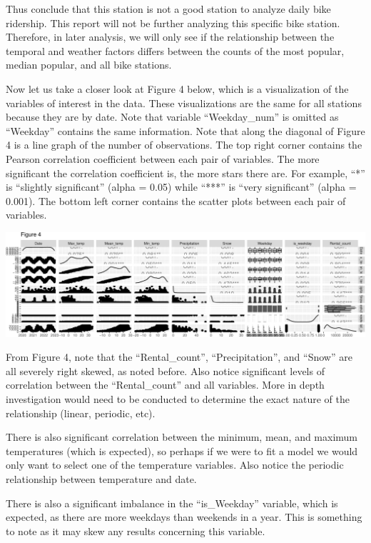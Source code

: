 \documentclass[
]{article}
\begin{document}
Thus conclude that this station is not a good station to analyze daily
bike ridership. This report will not be further analyzing this specific
bike station. Therefore, in later analysis, we will only see if the
relationship between the temporal and weather factors differs between
the counts of the most popular, median popular, and all bike stations.

Now let us take a closer look at Figure 4 below, which is a
visualization of the variables of interest in the data. These
visualizations are the same for all stations because they are by date.
Note that variable ``Weekday\_num'' is omitted as ``Weekday'' contains
the same information. Note that along the diagonal of Figure 4 is a line
graph of the number of observations. The top right corner contains the
Pearson correlation coefficient between each pair of variables. The more
significant the correlation coefficient is, the more stars there are.
For example, ``*'' is ``slightly significant'' (alpha = 0.05) while
``***'' is ``very significant'' (alpha = 0.001). The bottom left corner
contains the scatter plots between each pair of variables.

\includegraphics{Report_files/figure-latex/figure 4-1.pdf}

From Figure 4, note that the ``Rental\_count'', ``Precipitation'', and
``Snow'' are all severely right skewed, as noted before. Also notice
significant levels of correlation between the ``Rental\_count'' and all
variables. More in depth investigation would need to be conducted to
determine the exact nature of the relationship (linear, periodic, etc).

There is also significant correlation between the minimum, mean, and
maximum temperatures (which is expected), so perhaps if we were to fit a
model we would only want to select one of the temperature variables.
Also notice the periodic relationship between temperature and date.

There is also a significant imbalance in the ``is\_Weekday'' variable,
which is expected, as there are more weekdays than weekends in a year.
This is something to note as it may skew any results concerning this
variable.
\end{document}
